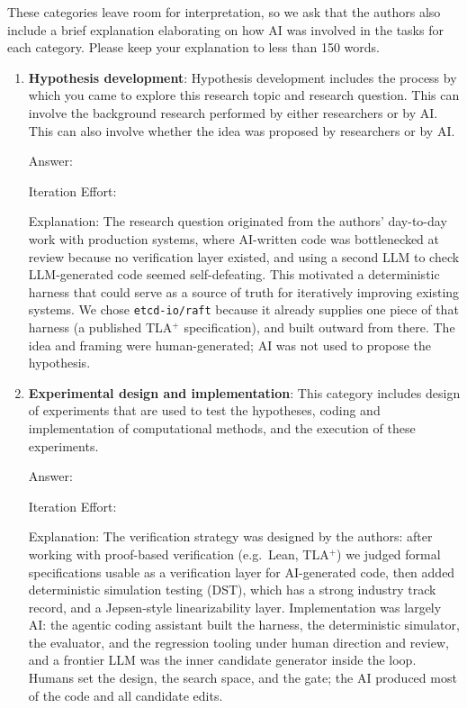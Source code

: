 \documentclass{article}
\begin{document}
These categories leave room for interpretation, so we ask that the authors also include a brief explanation elaborating on how AI was involved in the tasks for each category. Please keep your explanation to less than 150 words.

\begin{enumerate}

    \item \textbf{Hypothesis development}: Hypothesis development includes the process by which you came to explore this research topic and research question. This can involve the background research performed by either researchers or by AI. This can also involve whether the idea was proposed by researchers or by AI.

    Answer: \involvementA{}

    Iteration Effort: \iterationNA{}

    Explanation: The research question originated from the authors'
    day-to-day work with production systems, where AI-written code was
    bottlenecked at review because no verification layer existed, and
    using a second LLM to check LLM-generated code seemed self-defeating.
    This motivated a deterministic harness that could serve as a source
    of truth for iteratively improving existing systems. We chose
    \texttt{etcd-io/raft} because it already supplies one piece of that
    harness (a published TLA$^{+}$ specification), and built outward
    from there. The idea and framing were human-generated; AI was not
    used to propose the hypothesis.

    \item \textbf{Experimental design and implementation}: This category includes design of experiments that are used to test the hypotheses, coding and implementation of computational methods, and the execution of these experiments.

    Answer: \involvementC{}

    Iteration Effort: \iterationHigh{}

    Explanation: The verification strategy was designed by the authors:
    after working with proof-based verification (e.g.\ Lean, TLA$^{+}$)
    we judged formal specifications usable as a verification layer for
    AI-generated code, then added deterministic simulation testing
    (DST), which has a strong industry track record, and a Jepsen-style
    linearizability layer. Implementation was largely AI: the agentic
    coding assistant built the harness, the deterministic simulator, the
    evaluator, and the regression tooling under human direction and
    review, and a frontier LLM was the inner candidate generator inside
    the loop. Humans set the design, the search space, and the gate; the
    AI produced most of the code and all candidate edits.


\end{enumerate}
\end{document}
